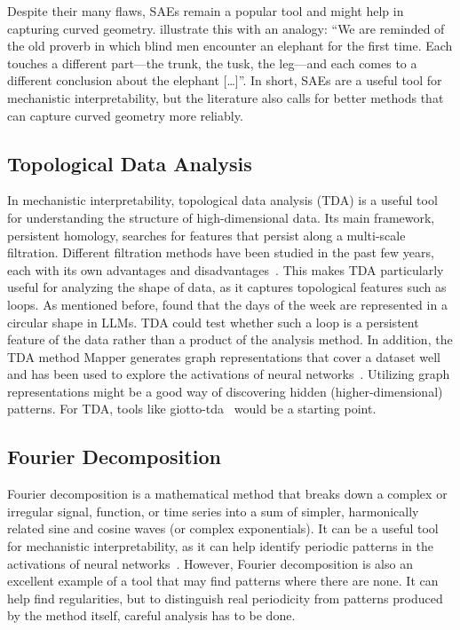 \documentclass[11pt,a4paper]{article}
\begin{document}
Despite their many flaws, SAEs remain a popular tool and might help in capturing curved geometry. \textcite{bhalla2026blog} illustrate this with an analogy: \enquote{We are reminded of the old proverb in which blind men encounter an elephant for the first time. Each touches a different part---the trunk, the tusk, the leg---and each comes to a different conclusion about the elephant [\dots]}.
In short, SAEs are a useful tool for mechanistic interpretability, but the literature also calls for better methods that can capture curved geometry more reliably.
\subsection{Topological Data Analysis}
In mechanistic interpretability, topological data analysis (TDA) is a useful tool for understanding the structure of high-dimensional data. Its main framework, persistent homology, searches for features that persist along a multi-scale filtration. Different filtration methods have been studied in the past few years, each with its own advantages and disadvantages~\cite{gardinazzi2024persistent}.
This makes TDA particularly useful for analyzing the shape of data, as it captures topological features such as loops.
As mentioned before, \textcite{engels2025notall} found that the days of the week are represented in a circular shape in LLMs. TDA could test whether such a loop is a persistent feature of the data rather than a product of the analysis method. In addition, the TDA method Mapper generates graph representations that cover a dataset well and has been used to explore the activations of neural networks~\cite{rathore2021topoact}.
Utilizing graph representations might be a good way of discovering hidden (higher-dimensional) patterns.
For TDA, tools like giotto-tda~\cite{tauzin2021giotto} would be a starting point.

\subsection{Fourier Decomposition}
Fourier decomposition is a mathematical method that breaks down a complex or irregular signal, function, or time series into a sum of simpler, harmonically related sine and cosine waves (or complex exponentials).
It can be a useful tool for mechanistic interpretability, as it can help identify periodic patterns in the activations of neural networks~\cite{feucht2026arithmetic}. However, Fourier decomposition is also an excellent example of a tool that may find patterns where there are none. It can help find regularities, but to distinguish real periodicity from patterns produced by the method itself, careful analysis has to be done.
\end{document}
